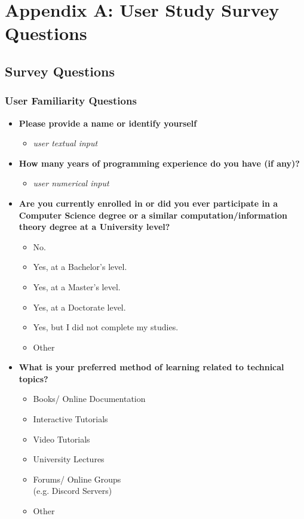 \chapter{Appendix A: User Study Survey Questions}
\label{chap:appendixa}
\section{Survey Questions}
%

\subsection{User Familiarity Questions}
\begin{itemize}
	\item  \textbf{Please provide a name or identify yourself}
	      \begin{itemize}
		      \item  \textit{user textual input}

	      \end{itemize}

	\item  \textbf{How many years of programming experience do you have (if any)?}
	      \begin{itemize}
		      \item  \textit{user numerical input}

	      \end{itemize}
	\item  \textbf{Are you currently enrolled in or did you ever participate in a Computer Science degree or a similar computation/information theory degree at a University level?}
	      \begin{itemize}
		      \item  No.
		      \item  Yes, at a Bachelor's level.
		      \item  Yes, at a Master's level.
		      \item  Yes, at a Doctorate level.
		      \item  Yes, but I did not complete my studies.
		      \item  Other
	      \end{itemize}

	\item  \textbf{What is your preferred method of learning related to technical topics?}
	      \begin{itemize}
		      \item Books/ Online Documentation
		      \item Interactive Tutorials
		      \item Video Tutorials
		      \item University Lectures
		      \item Forums/ Online Groups \\(e.g. Discord Servers)
		      \item  Other
	      \end{itemize}


\end{itemize}
